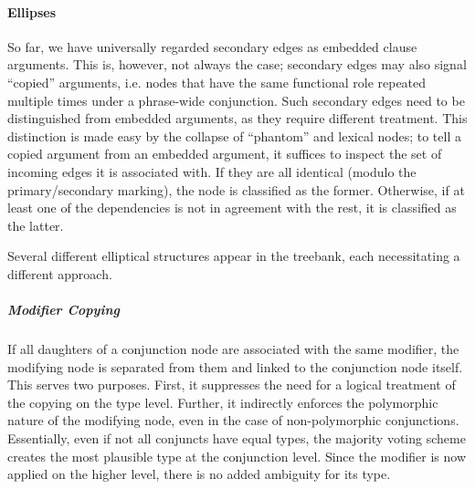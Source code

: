 \paragraph{Ellipses}
So far, we have universally regarded secondary edges as embedded clause arguments.
This is, however, not always the case; secondary edges may also signal ``copied'' arguments, i.e. nodes that have the same functional role repeated multiple times under a phrase-wide conjunction.
Such secondary edges need to be distinguished from embedded arguments, as they require different treatment.
This distinction is made easy by the collapse of ``phantom'' and lexical nodes; to tell a copied argument from an embedded argument, it suffices to inspect the set of incoming edges it is associated with.
If they are all identical (modulo the primary/secondary marking), the node is classified as the former. 
Otherwise, if at least one of the dependencies is not in agreement with the rest, it is classified as the latter.

Several different elliptical structures appear in the treebank, each necessitating a different approach.

\subparagraph{Modifier Copying}
If all daughters of a conjunction node are associated with the same modifier, the modifying node is separated from them and linked to the conjunction node itself.
This serves two purposes. 
First, it suppresses the need for a logical treatment of the copying on the type level.
Further, it indirectly enforces the polymorphic nature of the modifying node, even in the case of non-polymorphic conjunctions.
Essentially, even if not all conjuncts have equal types, the majority voting scheme creates the most plausible type at the conjunction level. 
Since the modifier is now applied on the higher level, there is no added ambiguity for its type.

